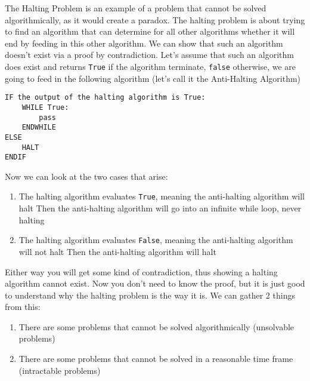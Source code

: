   \noindent
  The Halting Problem is an example of a problem that cannot be solved algorithmically, as it would create a paradox. The halting problem is about trying to find an algorithm that can determine for all other algorithms whether it will end by feeding in this other algorithm. We can show that such an algorithm doesn't exist via a proof by contradiction. Let's assume that such an algorithm does exist and returns \verb|True| if the algorithm terminate, \verb|false| otherwise, we are going to feed in the following algorithm (let's call it the Anti-Halting Algorithm)
  \begin{verbatim}
IF the output of the halting algorithm is True:
    WHILE True:
        pass
    ENDWHILE
ELSE
    HALT
ENDIF
  \end{verbatim}
  Now we can look at the two cases that arise:
  \begin{enumerate}
  	\item The halting algorithm evaluates \verb|True|, meaning the anti-halting algorithm will halt
	  	\subitem Then the anti-halting algorithm will go into an infinite while loop, never halting
	\item The halting algorithm evaluates \verb|False|, meaning the anti-halting algorithm will not halt
		\subitem Then the anti-halting algorithm will halt
  \end{enumerate}
  
  Either way you will get some kind of contradiction, thus showing a halting algorithm cannot exist. Now you don't need to know the proof, but it is just good to understand why the halting problem is the way it is. We can gather 2 things from this:
  \begin{enumerate}
  	\item There are some problems that cannot be solved algorithmically (unsolvable problems)
  	\item There are some problems that cannot be solved in a reasonable time frame (intractable problems)
  \end{enumerate}

